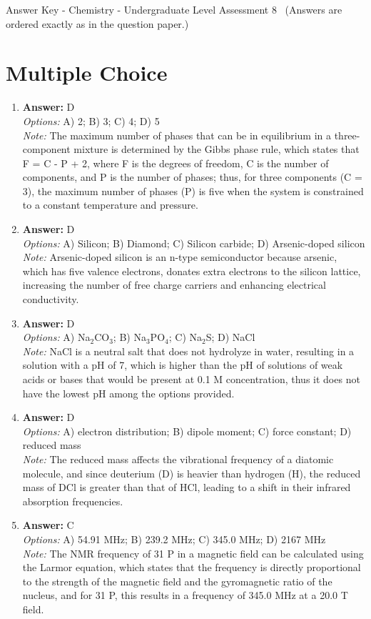 \documentclass[12pt]{article}
\begin{document}
\begin{center}
Answer Key - Chemistry - Undergraduate Level Assessment 8 \
\small (Answers are ordered exactly as in the question paper.)
\end{center}

\section*{Multiple Choice}
\begin{enumerate}[label=\arabic*.]
\item \textbf{Answer:} D
\\ \textit{Options:} A) 2; B) 3; C) 4; D) 5
\\ \textit{Note:} The maximum number of phases that can be in equilibrium in a three-component mixture is determined by the Gibbs phase rule, which states that F = C - P + 2, where F is the degrees of freedom, C is the number of components, and P is the number of phases; thus, for three components (C = 3), the maximum number of phases (P) is five when the system is constrained to a constant temperature and pressure.
\item \textbf{Answer:} D
\\ \textit{Options:} A) Silicon; B) Diamond; C) Silicon carbide; D) Arsenic-doped silicon
\\ \textit{Note:} Arsenic-doped silicon is an n-type semiconductor because arsenic, which has five valence electrons, donates extra electrons to the silicon lattice, increasing the number of free charge carriers and enhancing electrical conductivity.
\item \textbf{Answer:} D
\\ \textit{Options:} A) Na$_{2}$CO$_{3}$; B) Na$_{3}$PO$_{4}$; C) Na$_{2}$S; D) NaCl
\\ \textit{Note:} NaCl is a neutral salt that does not hydrolyze in water, resulting in a solution with a pH of 7, which is higher than the pH of solutions of weak acids or bases that would be present at 0.1 M concentration, thus it does not have the lowest pH among the options provided.
\item \textbf{Answer:} D
\\ \textit{Options:} A) electron distribution; B) dipole moment; C) force constant; D) reduced mass
\\ \textit{Note:} The reduced mass affects the vibrational frequency of a diatomic molecule, and since deuterium (D) is heavier than hydrogen (H), the reduced mass of DCl is greater than that of HCl, leading to a shift in their infrared absorption frequencies.
\item \textbf{Answer:} C
\\ \textit{Options:} A) 54.91 MHz; B) 239.2 MHz; C) 345.0 MHz; D) 2167 MHz
\\ \textit{Note:} The NMR frequency of 31 P in a magnetic field can be calculated using the Larmor equation, which states that the frequency is directly proportional to the strength of the magnetic field and the gyromagnetic ratio of the nucleus, and for 31 P, this results in a frequency of 345.0 MHz at a 20.0 T field.
\end{enumerate}
\end{document}
